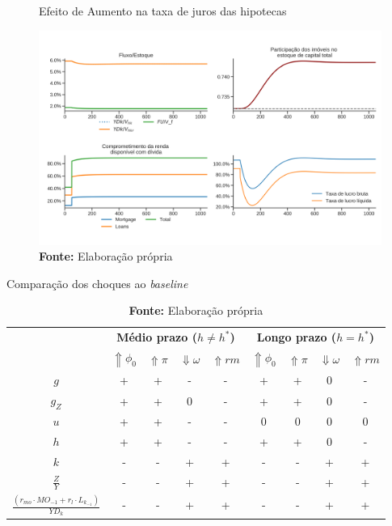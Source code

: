 \begin{figure}[H]
	\centering
	\caption{Efeito de Aumento na taxa de juros das hipotecas}
	\label{choque_3Norms}
	\includegraphics[width=\textwidth]{../../Modelo/Versoes/Shock_3Norms.png}
	\caption*{\textbf{Fonte:} Elaboração própria}
\end{figure}

\begin{table}[H]
	\centering
	\caption{Comparação dos choques ao \textit{baseline}}
	\label{ResumoChoques}
		\begin{tabular}{c|c|c|c|c||c|c|c|c}
			\hline\hline
			\multirow{2}{*}{} & \multicolumn{4}{c||}{\textbf{Médio prazo ($h \neq h^*$)}} & \multicolumn{4}{c}{\textbf{Longo prazo ($h = h^*$)}} \\ \cline{2-9} 
			& \textbf{$\Uparrow \phi_0$} & \textbf{$\Uparrow \pi$} & \textbf{$\Downarrow \omega$} & \textbf{$\Uparrow rm$} & \textbf{$\Uparrow \phi_0$} & \textbf{$\Uparrow \pi$} & \textbf{$\Downarrow \omega$} & \textbf{$\Uparrow rm$} \\ \hline
			\textbf{$g$} & + & + & - & - & + & + & 0 & - \\ \hline
			\textbf{$g_Z$} & + & + & 0 & - & + & + & 0 & - \\ \hline
			\textbf{$u$} & + & + & - & - & 0 & 0 & 0 & 0 \\ \hline
			\textbf{$h$} & + & + & - & - & + & + & 0 & - \\ \hline
			\textbf{$k$} & - & - & + & + & - & - & + & + \\ \hline
			\textbf{$\frac{Z}{Y}$} & - & - & + & + & - & - & + & + \\ \hline
			\textit{$\frac{(r_{mo}\cdot MO_{-1} + r_l\cdot L_{k_{-1}})}{YD_k}$} & - & - & + & + & - & - & + & + \\ \hline\hline
		\end{tabular}%
	\caption*{\textbf{Fonte:} Elaboração própria}
\end{table}


